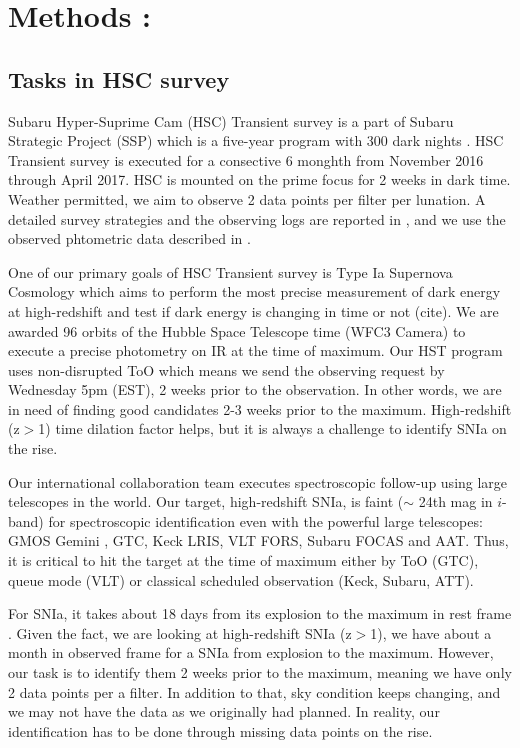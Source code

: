 \documentclass[useamsfonts]{pasj01}
\begin{document}
\section{Methods :}
\subsection{Tasks in HSC survey}
Subaru Hyper-Suprime Cam (HSC) Transient survey is a part of Subaru Strategic Project (SSP) which is a five-year program with 300 dark nights \citep{aihara18a,miyazaki18a}.
HSC Transient survey is executed for a consective 6 monghth from November 2016 through April 2017.
HSC is mounted on the prime focus for 2 weeks in dark time.   
Weather permitted, we aim to observe 2 data points per filter per lunation.
A detailed survey strategies and the observing logs are reported in \citet{yasuda19a}, and we use the observed phtometric data described in \citet{yasuda19a}.

One of our primary goals of HSC Transient survey is Type Ia Supernova Cosmology which aims to perform the most precise measurement of dark energy at high-redshift and test if dark energy is changing in time or not (cite).
We are awarded 96 orbits of the Hubble Space Telescope time (WFC3 Camera) to execute a precise photometry on IR at the time of maximum.
Our HST program uses non-disrupted ToO which means we send the observing request by Wednesday 5pm (EST), 2 weeks prior to the observation.
In other words, we are in need of finding good candidates 2-3 weeks prior to the maximum.  High-redshift (z$>$1) time dilation factor helps, but it is always a challenge to identify SNIa on the rise.

Our international collaboration team executes spectroscopic follow-up using large telescopes in the world.  
Our target, high-redshift SNIa, is faint ($\sim$ 24th mag in $i$-band) for spectroscopic identification even with the powerful large telescopes: GMOS Gemini \citep{hook04a}, GTC, Keck LRIS, VLT FORS, Subaru FOCAS \citep{kashikawa02a} and AAT.  
Thus, it is critical to hit the target at the time of maximum either by ToO (GTC), queue mode (VLT) or classical scheduled observation (Keck, Subaru, ATT).

For SNIa, it takes about 18 days from its explosion to the maximum in rest frame \citep{conley06a,papadogiannakis19a}.   Given the fact, we are looking at high-redshift SNIa (z$>$1), we have about a month in observed frame for a SNIa from explosion to the maximum.   However, our task is to identify them 2 weeks prior to the maximum, meaning we have only 2 data points per a filter.   In addition to that, sky condition keeps changing, and we may not have the data as we originally had planned.   In reality, our identification has to be done through missing data points on the rise.
\end{document}
